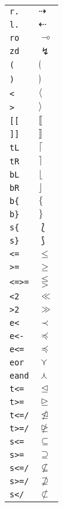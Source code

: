\begin{longtable}{ll}
\texttt{r.}&${}\dashrightarrow {}$\\
\texttt{l.}&${}\dashleftarrow {}$\\
\texttt{ro}&${}\multimap {}$\\
\texttt{zd}&${}\lightning {}$\\
\texttt{(}&${}\lgroup {}$\\
\texttt{)}&${}\rgroup {}$\\
\texttt{<}&${}\langle {}$\\
\texttt{>}&${}\rangle {}$\\
\texttt{[[}&${}\llbracket {}$\\
\texttt{]]}&${}\rrbracket {}$\\
\texttt{tL}&${}\lceil {}$\\
\texttt{tR}&${}\rceil {}$\\
\texttt{bL}&${}\lfloor {}$\\
\texttt{bR}&${}\rfloor {}$\\
\texttt{b\{}&${}\{ {}$\\
\texttt{b\}}&${}\} {}$\\
\texttt{s\{}&${}\lbag {}$\\
\texttt{s\}}&${}\rbag {}$\\
\texttt{<=}&${}\leq {}$\\
\texttt{>=}&${}\geq {}$\\
\texttt{<=>=}&${}\lesseqgtr {}$\\
\texttt{<2}&${}\ll {}$\\
\texttt{>2}&${}\gg {}$\\
\texttt{e<}&${}\prec {}$\\
\texttt{e<{-}}&${}\preceq {}$\\
\texttt{e<=}&${}\preccurlyeq {}$\\
\texttt{eor}&${}\curlyvee {}$\\
\texttt{eand}&${}\curlywedge {}$\\
\texttt{t<=}&${}\trianglelefteq {}$\\
\texttt{t>=}&${}\trianglerighteq {}$\\
\texttt{t<=/}&${}\ntrianglelefteq {}$\\
\texttt{t>=/}&${}\ntrianglerighteq {}$\\
\texttt{s<=}&${}\subseteq {}$\\
\texttt{s>=}&${}\supseteq {}$\\
\texttt{s<=/}&${}\not\subseteq {}$\\
\texttt{s>=/}&${}\not\supseteq {}$\\
\texttt{s</}&${}\not\subset {}$\\

\end{longtable}
